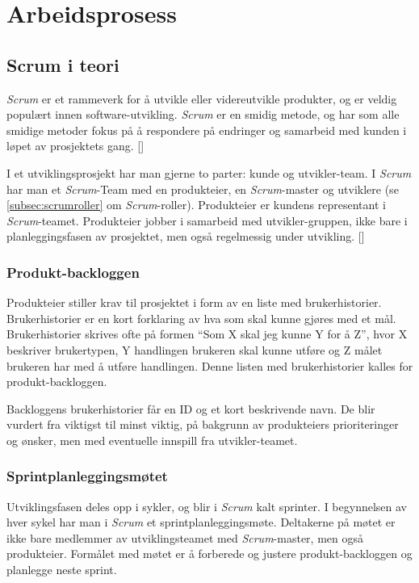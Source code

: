 \documentclass[12pt,a4paper,norsk]{article}
\begin{document}
  \section{Arbeidsprosess}
  \subsection{Scrum i teori}
  \textit{Scrum} er et rammeverk for å utvikle eller videreutvikle produkter, og er veldig populært innen software-utvikling. \textit{Scrum} er en smidig metode, og har som alle smidige metoder fokus på å respondere på endringer og samarbeid med kunden i løpet av prosjektets gang. [\cite{agilemanifesto}]

  I et utviklingsprosjekt har man gjerne to parter: kunde og utvikler-team. I \textit{Scrum} har man et \textit{Scrum}-Team med en produkteier, en \textit{Scrum}-master og utviklere (se  \cref{subsec:scrumroller} om \textit{Scrum}-roller). Produkteier er kundens representant i \textit{Scrum}-teamet. Produkteier jobber i samarbeid med utvikler-gruppen, ikke bare i planleggingsfasen av prosjektet, men også regelmessig under utvikling.
  [\cite{scrumguides}]
  \subsubsection{Produkt-backloggen}
  Produkteier stiller krav til prosjektet i form av en liste med brukerhistorier. Brukerhistorier er en kort forklaring av hva som skal kunne gjøres med et mål.  Brukerhistorier skrives ofte på formen “Som X skal jeg kunne Y for å Z”, hvor X beskriver brukertypen, Y handlingen brukeren skal kunne utføre og Z målet brukeren har med å utføre handlingen. \cite[side 9]{kniberg} Denne listen med brukerhistorier kalles for produkt-backloggen.

    Backloggens brukerhistorier får en ID og et kort beskrivende navn. De blir vurdert fra viktigst til minst viktig, på bakgrunn av produkteiers prioriteringer og ønsker, men med eventuelle innspill fra utvikler-teamet.
  \subsubsection{Sprintplanleggingsmøtet}
  Utviklingsfasen deles opp i sykler, og blir i \textit{Scrum} kalt sprinter. I begynnelsen av hver sykel har man i \textit{Scrum} et sprintplanleggingsmøte. Deltakerne på møtet er ikke bare medlemmer av utviklingsteamet med \textit{Scrum}-master, men også produkteier. Formålet med møtet er å forberede og justere produkt-backloggen og planlegge neste sprint.
\end{document}

